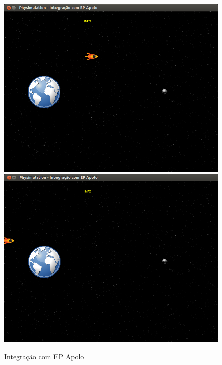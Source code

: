\begin{figure}[H]
	\includegraphics[scale=0.2]{images/apolo-4.png}
	\includegraphics[scale=0.2]{images/apolo-5.png}
	\caption{Integração com EP Apolo}
\end{figure}


